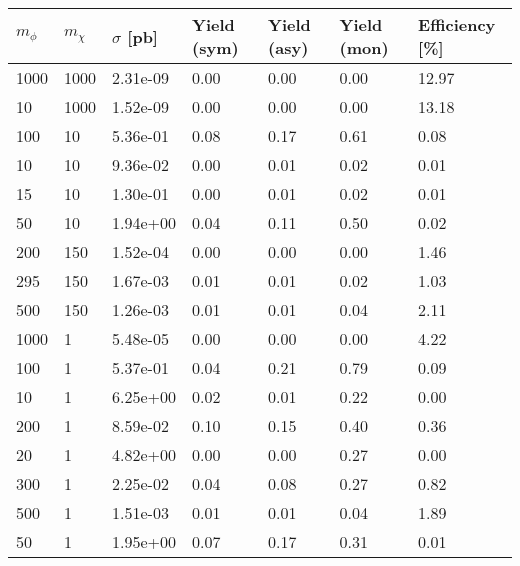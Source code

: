 \begin{table}
\small
\centering
\begin{tabular}{lllllll}
\hline
$m_\phi$ & $m_\chi$ & $\sigma$ [pb] & Yield (sym) & Yield (asy) & Yield (mon) & Efficiency [\%] \\ \hline
1000      &   1000      &   2.31e-09  &   0.00      &   0.00      &   0.00      &   12.97     \\ 
10        &   1000      &   1.52e-09  &   0.00      &   0.00      &   0.00      &   13.18     \\ 
100       &   10        &   5.36e-01  &   0.08      &   0.17      &   0.61      &   0.08      \\ 
10        &   10        &   9.36e-02  &   0.00      &   0.01      &   0.02      &   0.01      \\ 
15        &   10        &   1.30e-01  &   0.00      &   0.01      &   0.02      &   0.01      \\ 
50        &   10        &   1.94e+00  &   0.04      &   0.11      &   0.50      &   0.02      \\ 
200       &   150       &   1.52e-04  &   0.00      &   0.00      &   0.00      &   1.46      \\ 
295       &   150       &   1.67e-03  &   0.01      &   0.01      &   0.02      &   1.03      \\ 
500       &   150       &   1.26e-03  &   0.01      &   0.01      &   0.04      &   2.11      \\ 
1000      &   1         &   5.48e-05  &   0.00      &   0.00      &   0.00      &   4.22      \\ 
100       &   1         &   5.37e-01  &   0.04      &   0.21      &   0.79      &   0.09      \\ 
10        &   1         &   6.25e+00  &   0.02      &   0.01      &   0.22      &   0.00      \\ 
200       &   1         &   8.59e-02  &   0.10      &   0.15      &   0.40      &   0.36      \\ 
20        &   1         &   4.82e+00  &   0.00      &   0.00      &   0.27      &   0.00      \\ 
300       &   1         &   2.25e-02  &   0.04      &   0.08      &   0.27      &   0.82      \\ 
500       &   1         &   1.51e-03  &   0.01      &   0.01      &   0.04      &   1.89      \\ 
50        &   1         &   1.95e+00  &   0.07      &   0.17      &   0.31      &   0.01      \\ 

\end{tabular}
\end{table}
